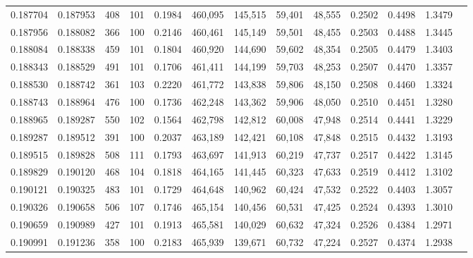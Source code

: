 \begin{tabular}{rrrrrrrrrrrrr}
0.187704 & 0.187953 &   408 & 101 &                                     0.1984 & 460,095 & 145,515 &  59,401 &  48,555 & 0.2502 & 0.4498 & 1.3479 \\
0.187956 & 0.188082 &   366 & 100 &                                     0.2146 & 460,461 & 145,149 &  59,501 &  48,455 & 0.2503 & 0.4488 & 1.3445 \\
0.188084 & 0.188338 &   459 & 101 &                                     0.1804 & 460,920 & 144,690 &  59,602 &  48,354 & 0.2505 & 0.4479 & 1.3403 \\
0.188343 & 0.188529 &   491 & 101 &                                     0.1706 & 461,411 & 144,199 &  59,703 &  48,253 & 0.2507 & 0.4470 & 1.3357 \\
0.188530 & 0.188742 &   361 & 103 &                                     0.2220 & 461,772 & 143,838 &  59,806 &  48,150 & 0.2508 & 0.4460 & 1.3324 \\
0.188743 & 0.188964 &   476 & 100 &                                     0.1736 & 462,248 & 143,362 &  59,906 &  48,050 & 0.2510 & 0.4451 & 1.3280 \\
0.188965 & 0.189287 &   550 & 102 &                                     0.1564 & 462,798 & 142,812 &  60,008 &  47,948 & 0.2514 & 0.4441 & 1.3229 \\
0.189287 & 0.189512 &   391 & 100 &                                     0.2037 & 463,189 & 142,421 &  60,108 &  47,848 & 0.2515 & 0.4432 & 1.3193 \\
0.189515 & 0.189828 &   508 & 111 &                                     0.1793 & 463,697 & 141,913 &  60,219 &  47,737 & 0.2517 & 0.4422 & 1.3145 \\
0.189829 & 0.190120 &   468 & 104 &                                     0.1818 & 464,165 & 141,445 &  60,323 &  47,633 & 0.2519 & 0.4412 & 1.3102 \\
0.190121 & 0.190325 &   483 & 101 &                                     0.1729 & 464,648 & 140,962 &  60,424 &  47,532 & 0.2522 & 0.4403 & 1.3057 \\
0.190326 & 0.190658 &   506 & 107 &                                     0.1746 & 465,154 & 140,456 &  60,531 &  47,425 & 0.2524 & 0.4393 & 1.3010 \\
0.190659 & 0.190989 &   427 & 101 &                                     0.1913 & 465,581 & 140,029 &  60,632 &  47,324 & 0.2526 & 0.4384 & 1.2971 \\
0.190991 & 0.191236 &   358 & 100 &                                     0.2183 & 465,939 & 139,671 &  60,732 &  47,224 & 0.2527 & 0.4374 & 1.2938 \\

\end{tabular}
